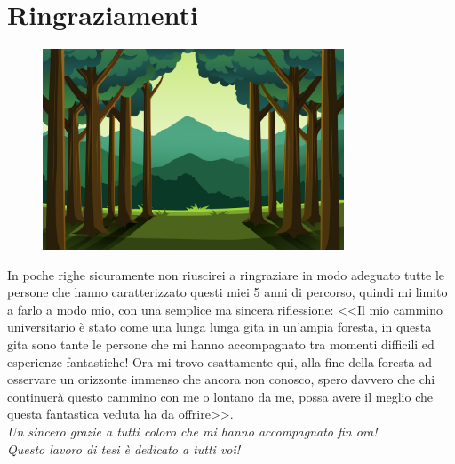 \chapter{Ringraziamenti}
\begin{figure}[h]
        \centering
        \includegraphics[width=0.8\textwidth]{figure/ringraziamenti.jpg}
    \end{figure}

In poche righe sicuramente non riuscirei a ringraziare in modo adeguato tutte le persone che hanno caratterizzato questi miei 5 anni di percorso, quindi mi limito a farlo a modo mio, con una semplice ma sincera riflessione: <<Il mio cammino universitario è stato come una lunga lunga gita in un'ampia foresta, in questa gita sono tante le persone che mi hanno accompagnato tra momenti difficili ed esperienze fantastiche! Ora mi trovo esattamente qui, alla fine della foresta ad osservare un orizzonte immenso che ancora non conosco, spero davvero che chi continuerà questo cammino con me o lontano da me, possa avere il meglio che questa fantastica veduta ha da offrire>>.\\

\centering
\emph{Un sincero grazie a tutti coloro che mi hanno accompagnato fin ora!\\ Questo lavoro di tesi è dedicato a tutti voi!}
 